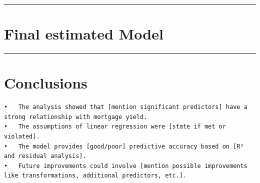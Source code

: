 \documentclass[
  11pt,
]{article}
\begin{document}
\begin{center}\rule{0.5\linewidth}{0.5pt}\end{center}

\section{Final estimated Model}\label{final-estimated-model}

\begin{center}\rule{0.5\linewidth}{0.5pt}\end{center}

\section{Conclusions}\label{conclusions}

\begin{verbatim}
•   The analysis showed that [mention significant predictors] have a strong relationship with mortgage yield.
•   The assumptions of linear regression were [state if met or violated].
•   The model provides [good/poor] predictive accuracy based on [R² and residual analysis].
•   Future improvements could involve [mention possible improvements like transformations, additional predictors, etc.].
\end{verbatim}
\end{document}
